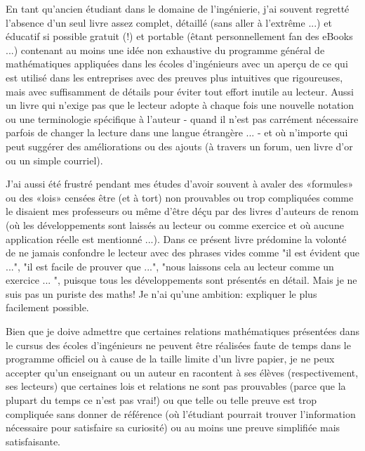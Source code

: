 	En tant qu'ancien \'etudiant dans le domaine de l'ing\'enierie, j'ai souvent regrett\'e l'absence d'un seul livre assez complet, d\'etaill\'e (sans aller à l'extrême ...) et \'educatif si possible gratuit (!) et portable (êtant personnellement fan des eBooks ...) contenant au moins une id\'ee non exhaustive du programme g\'en\'eral de math\'ematiques appliqu\'ees dans les \'ecoles d'ing\'enieurs avec un aperçu de ce qui est utilis\'e dans les entreprises avec des preuves plus intuitives que rigoureuses, mais avec suffisamment de d\'etails pour \'eviter tout effort inutile au lecteur. Aussi un livre qui n'exige pas que le lecteur adopte à chaque fois une nouvelle notation ou une terminologie sp\'ecifique à l'auteur - quand il n'est pas carr\'ement n\'ecessaire parfois de changer la lecture dans une langue \'etrangère ... - et où n'importe qui peut sugg\'erer des am\'eliorations ou des ajouts (à travers un forum, uen livre d'or ou un simple courriel).

	J'ai aussi \'et\'e frustr\'e pendant mes \'etudes d'avoir souvent à avaler des «formules» ou des «lois» cens\'ees être (et à tort) non prouvables ou trop compliqu\'ees comme le disaient mes professeurs ou même d'être d\'eçu par des livres d'auteurs de renom (où les d\'eveloppements sont laiss\'es au lecteur ou comme exercice et où aucune application r\'eelle est mentionn\'e ...). Dans ce pr\'esent livre pr\'edomine la volont\'e de ne jamais confondre le lecteur avec des phrases vides comme "il est \'evident que ...", "il est facile de prouver que ...", "nous laissons cela au lecteur comme un exercice ... ", puisque tous les d\'eveloppements sont pr\'esent\'es en d\'etail. Mais je ne suis pas un puriste des maths! Je n'ai qu'une ambition: expliquer le plus facilement possible.
	
	Bien que je doive admettre que certaines relations math\'ematiques pr\'esent\'ees dans le cursus des \'ecoles d'ing\'enieurs ne peuvent être r\'ealis\'ees faute de temps dans le programme officiel ou à cause de la taille limite d'un livre papier, je ne peux accepter qu'un enseignant ou un auteur en racontent à ses \'elèves (respectivement, ses lecteurs) que certaines lois et relations ne sont pas prouvables (parce que la plupart du temps ce n'est pas vrai!) ou que telle ou telle preuve est trop compliqu\'ee sans donner de r\'ef\'erence (où l'\'etudiant pourrait trouver l'information n\'ecessaire pour satisfaire sa curiosit\'e) ou au moins une preuve simplifi\'ee mais satisfaisante.
	
